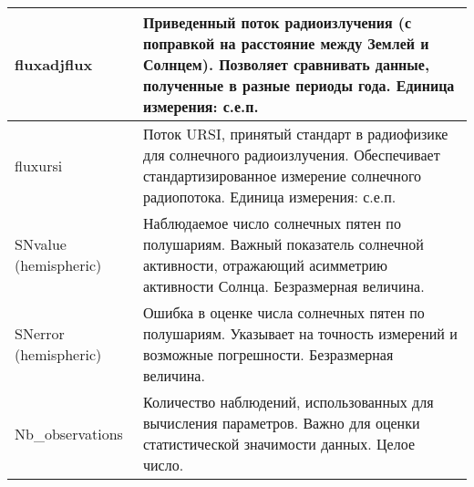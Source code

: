 \begin{longtable}{|l|p{12cm}|}
	\hline
	fluxadjflux           & Приведенный поток радиоизлучения (с поправкой на расстояние между Землей и Солнцем). Позволяет сравнивать данные, полученные в разные периоды года. Единица измерения: с.е.п.                                                                                                                                                                                                                                                                                                                                    \\
	\hline
	fluxursi              & Поток URSI, принятый стандарт в радиофизике для солнечного радиоизлучения. Обеспечивает стандартизированное измерение солнечного радиопотока. Единица измерения: с.е.п.                                                                                                                                                                                                                                                                                                                                          \\
	\hline
	SNvalue (hemispheric) & Наблюдаемое число солнечных пятен по полушариям. Важный показатель солнечной активности, отражающий асимметрию активности Солнца. Безразмерная величина.                                                                                                                                                                                                                                                                                                                                                         \\
	\hline
	SNerror (hemispheric) & Ошибка в оценке числа солнечных пятен по полушариям. Указывает на точность измерений и возможные погрешности. Безразмерная величина.                                                                                                                                                                                                                                                                                                                                                                             \\
	\hline
	Nb\_observations      & Количество наблюдений, использованных для вычисления параметров. Важно для оценки статистической значимости данных. Целое число.                                                                                                                                                                                                                                                                                                                                                                                 \\
\end{longtable}


